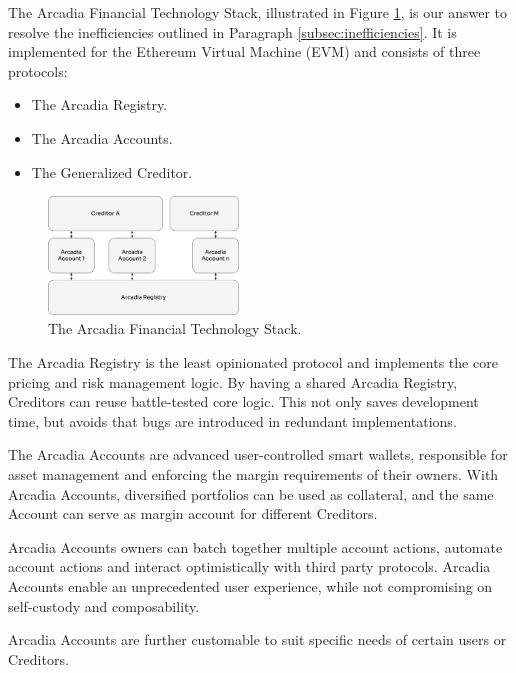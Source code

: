\documentclass[sigconf,nonacm]{acmart}
\begin{document}
The Arcadia Financial Technology Stack, illustrated in Figure \ref{fig:arcadia-financial-technology-stack},
is our answer to resolve the inefficiencies outlined in Paragraph \ref{subsec:inefficiencies}.
It is implemented for the Ethereum Virtual Machine (EVM) and consists of three protocols:
\begin{itemize}
    \item The Arcadia Registry.
    \item The Arcadia Accounts.
    \item The Generalized Creditor.
\end{itemize}

\begin{figure}
    \centering
    \includegraphics[width=0.45\textwidth]{images/Arcadia-Financial-Technology-Stack.png}
    \caption{The Arcadia Financial Technology Stack. \label{fig:arcadia-financial-technology-stack}}
\end{figure}

The Arcadia Registry is the least opinionated protocol and implements the core pricing and risk management logic.
By having a shared Arcadia Registry, Creditors can reuse battle-tested core logic.
This not only saves development time, but avoids that bugs are introduced in redundant implementations.

The Arcadia Accounts are advanced user-controlled smart wallets, responsible for asset management and enforcing the margin requirements of their owners.
With Arcadia Accounts, diversified portfolios can be used as collateral, and the same Account can serve as margin account for different Creditors.

Arcadia Accounts owners can batch together multiple account actions, automate account actions and interact optimistically with third party protocols.
Arcadia Accounts enable an unprecedented user experience, while not compromising on self-custody and composability.

Arcadia Accounts are further customable to suit specific needs of certain users or Creditors.
\end{document}
